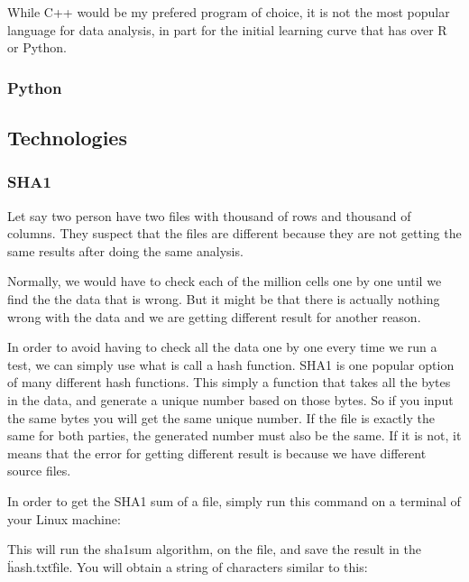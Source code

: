 While C++ would be my prefered program of choice, it is not the most popular language for data analysis, in part for the initial learning curve that has over R or Python.

\subsubsection{Python}

\subsection{Technologies}

\subsubsection{SHA1}

Let say two person have two files with thousand of rows and thousand of columns. They suspect that the files are different because they are not getting the same results after doing the same analysis.\vspace{3 mm}

Normally, we would have to check each of the million cells one by one until we find the the data that is wrong. But it might be that there is actually nothing wrong with the data and we are getting different result for another reason.\vspace{3 mm}

In order to avoid having to check all the data one by one every time we run a test, we can simply use what is call a hash function. SHA1 is one popular option of many different hash functions. This simply a function that takes all the bytes in the data, and generate a unique number based on those bytes. So if you input the same bytes you will get the same unique number. If the file is exactly the same for both parties, the generated number must also be the same. If it is not, it means that the error for getting different result is because we have different source files.\vspace{3 mm}

In order to get the SHA1 sum of a file, simply run this command on a terminal of your Linux machine:\vspace{3 mm}

 \vspace{3 mm}

This will run the sha1sum algorithm, on the  file, and save the result in the \"hash.txt\" file. You will obtain a string of characters similar to this: \vspace{3 mm}

